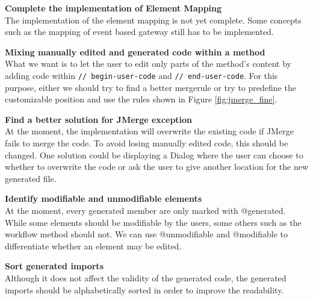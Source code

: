 \textbf{Complete the implementation of Element Mapping }\\
The implementation of the element mapping is not yet complete. Some concepts such as the mapping of event based gateway still has to be implemented. 

\textbf{Mixing manually edited and generated code within a method}\\
What we want is to let the user to edit only parts of the method's content by adding code within \verb|// begin-user-code| and \verb|// end-user-code|. For this purpose, either we should try to find a better mergerule or try to predefine the customizable position and use the rules shown in Figure \ref{fig:jmerge_fine}.

\textbf{Find a better solution for JMerge exception}\\
At the moment, the implementation will overwrite the existing code if JMerge fails to merge the code. To avoid losing manually edited code, this should be changed. One solution could be displaying a Dialog where the user can choose to whether to overwrite the code or ask the user to give another location for the new generated file. 

\textbf{Identify modifiable and unmodifiable elements}\\
At the moment, every generated member are only marked with @generated. While some elements should be modifiable by the users, some others such as the workflow method should not. We can use @unmodifiable and @modifiable to differentiate whether an element may be edited. 

\textbf{Sort generated imports}\\
Although it does not affect the validity of the generated code, the generated imports should be alphabetically sorted in order to improve the readability.




